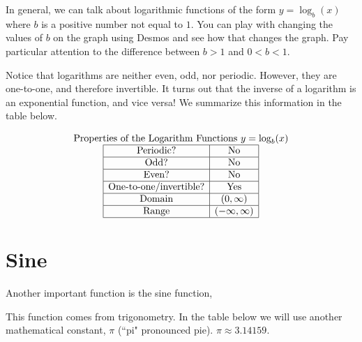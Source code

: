 \documentclass[nooutcomes]{ximera}
\begin{document}
In general, we can talk about logarithmic functions of the form $y=\log_b(x)$ where $b$ is a positive number not equal to $1$.  You can play with changing the values of $b$ on the graph using Desmos and see how that changes the graph.  Pay particular attention to the difference between $b>1$ and $0<b<1$.

\begin{center}  
\end{center}

Notice that logarithms are neither even, odd, nor periodic. However, they are one-to-one, and therefore invertible. It turns out that the inverse of a logarithm is an exponential function, and vice versa! We summarize this information in the table below.

\[
\begin{array}{ c  }
  \text{\normalfont Properties of the Logarithm Functions } y=\log_b(x)\\
 \begin{array}{|c|c|}
 \hline
\text{Periodic?} & \text{No} \\ \hline
\text{Odd?} & \text{No} \\ \hline
\text{Even?} & \text{No} \\ \hline
\text{One-to-one/invertible?} & \text{Yes} \\ \hline
\text{Domain} & (0,\infty)\\ \hline
\text{Range} & (-\infty,\infty)\\ \hline
 \end{array}
\end{array}
 \]


\newpage


\section{Sine}
Another important function is the sine function, 

\begin{center}
\end{center}



This function comes from trigonometry. In the table below we will use another mathematical constant, $\pi$ (``pi" pronounced pie). $\pi \approx 3.14159$.
\end{document}

